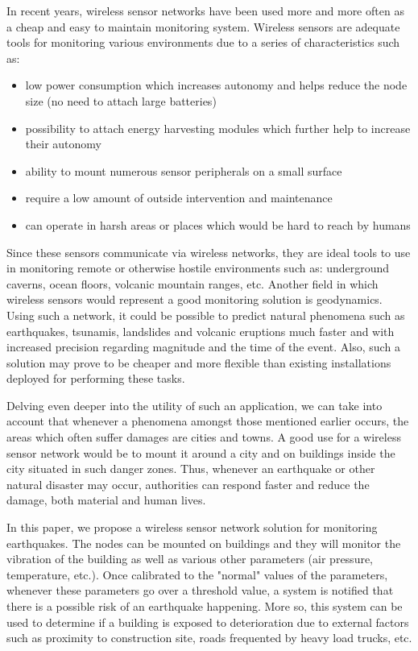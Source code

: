 In recent years, wireless sensor networks have been used more and more often as a cheap and easy to maintain monitoring system.
Wireless sensors are adequate tools for monitoring various environments due to a series of characteristics such as: 
\begin{itemize}
  \item low power consumption which increases autonomy and helps reduce the node size (no need to attach large batteries)
  \item possibility to attach energy harvesting modules which further help to increase their autonomy
  \item ability to mount numerous sensor peripherals on a small surface
  \item require a low amount of outside intervention and maintenance
  \item can operate in harsh areas or places which would be hard to reach by humans
\end{itemize}

Since these sensors communicate via wireless networks, they are ideal tools to use in monitoring remote or otherwise hostile 
environments such as: underground caverns, ocean floors, volcanic mountain ranges, etc. Another field in which wireless sensors 
would represent a good monitoring solution is geodynamics. Using such a network, it could be possible to predict natural phenomena such 
as earthquakes, tsunamis, landslides and volcanic eruptions much faster and with increased precision regarding magnitude and the 
time of the event. Also, such a solution may prove to be cheaper and more flexible than existing installations deployed for performing 
these tasks.

Delving even deeper into the utility of such an application, we can take into account that whenever a phenomena amongst those mentioned 
earlier occurs, the areas which often suffer damages are cities and towns. A good use for a wireless sensor network would be to mount it 
around a city and on buildings inside the city situated in such danger zones. Thus, whenever an earthquake or other natural disaster may occur, 
authorities can respond faster and reduce the damage, both material and human lives.

In this paper, we propose a wireless sensor network solution for monitoring earthquakes. The nodes can be mounted on buildings and 
they will monitor the vibration of the building as well as various other parameters (air pressure, temperature, etc.). Once calibrated 
to the "normal" values of the parameters, whenever these parameters go over a threshold value, a system is notified that there is a possible 
risk of an earthquake happening. More so, this system can be used to determine if a building is
exposed to deterioration due to external factors such as proximity to construction site, roads frequented by heavy load trucks, etc.

